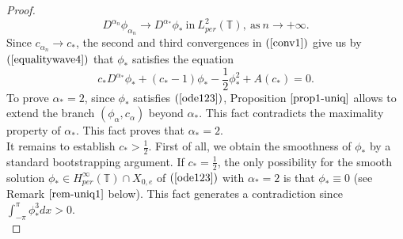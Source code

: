 \documentclass[12pt,reqno]{amsart}
\newcommand{\2}{L^2_{per}(0, T)}
\numberwithin{equation}{section}
\numberwithin{figure}{section}
\begin{document}
\begin{proof}
\begin{equation}\label{equalitywave4}
D^{\alpha_n}\phi_{\alpha_n}\rightarrow D^{\alpha_{*}}\phi_{{*}}\ \mbox{in}\ L_{per}^{2}(\mathbb{T}),\ \mbox{as}\ n\rightarrow+\infty.
\end{equation}
	\indent Since $c_{\alpha_n}\rightarrow c_*$, the second and third convergences in $(\ref{conv1})$ give us by $(\ref{equalitywave4})$ that $\phi_{*}$ satisfies the equation
	\begin{equation}\label{ode123}
	c_{*}D^{\alpha_{*}}\phi_{*}+(c_{*}-1)\phi_{*}-\frac{1}{2}\phi_*^2+A(c_*)=0.
	\end{equation}
\indent To prove $\alpha_*=2$, since $\phi_{*}$ satisfies $(\ref{ode123})$, Proposition $\ref{prop1-uniq}$ allows to extend the branch $(\phi_{\alpha}, c_{\alpha})$ beyond $\alpha_{*}$. This fact contradicts the maximality property of $\alpha_{*}$. This fact proves that $\alpha_{*}=2$.\\
	\indent It remains to establish $c_{*}>\frac{1}{2}$. First of all, we obtain the smoothness of $\phi_*$ by a standard bootstrapping argument. If $c_{*}=\frac{1}{2}$, the only possibility for the smooth solution $\phi_{*}\in H_{per}^{\infty}(\mathbb{T})\cap X_{0,e}$ of $(\ref{ode123})$ with $\alpha_{*}=2$ is that $\phi_{*}\equiv0$ (see Remark $\ref{rem-uniq1}$ below). This fact generates a contradiction since $\int_{-\pi}^{\pi}\phi_{*}^3dx>0$.\\
	
\end{proof}
\end{document}
